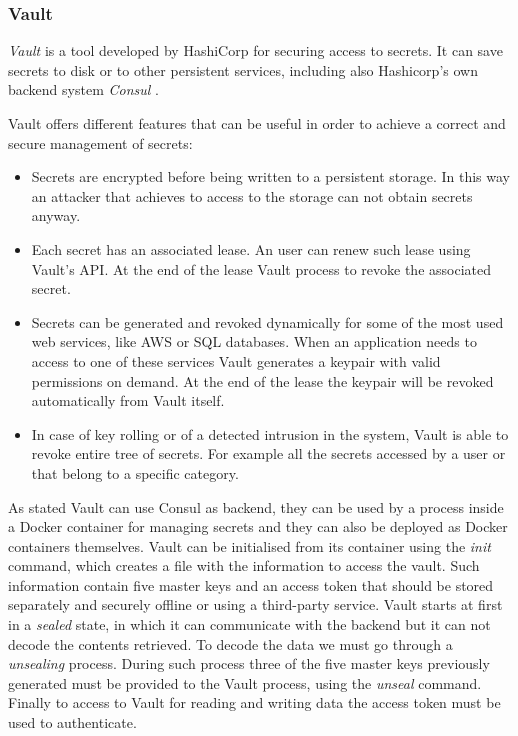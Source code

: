\documentclass[a4paper,12pt]{article}
\begin{document}
\subsubsection{Vault}

\textit{Vault} \cite{hashicorp_vault} is a tool developed by HashiCorp for
securing access to secrets. It can save secrets to disk or to other persistent
services, including also Hashicorp's own backend system
\textit{Consul} \cite{hashicorp_consul}.\par Vault offers different features that
can be useful in order to achieve a correct and secure management of secrets:
\begin{itemize}
  \item Secrets are encrypted before being written to a persistent storage. In
  this way an attacker that achieves to access to the storage can not
  obtain secrets anyway. 
  \item Each secret has an associated lease. An user can renew such lease using
  Vault's API. At the end of the lease Vault process to revoke the associated
  secret.
  \item Secrets can be generated and revoked dynamically for some of the most
  used web services, like AWS or SQL databases. When an application needs to
  access to one of these services Vault generates a keypair with valid
  permissions on demand. At the end of the lease the keypair will be revoked
  automatically from Vault itself.
  \item In case of key rolling or of a detected intrusion in the system, Vault
  is able to revoke entire tree of secrets. For example all the secrets
  accessed by a user or that belong to a specific category.
\end{itemize}
\par As stated Vault can use Consul as backend, they can be used by a process
inside a Docker container for managing secrets and they can also be deployed as
Docker containers themselves. Vault can be initialised from its container using
the \textit{init} command, which creates a file with the information to access
the vault. Such information contain five master keys and an access token that
should  be stored separately and securely offline or using a third-party
service. Vault starts at first in a \textit{sealed} state, in which it can
communicate with the backend but it can not decode the contents retrieved. To
decode the data we must go through a \textit{unsealing} process. During such
process three of the five master keys previously generated must be provided to
the Vault process, using the \textit{unseal} command. Finally to access to Vault
for reading and writing data the access token must be used to authenticate.  
\end{document}
